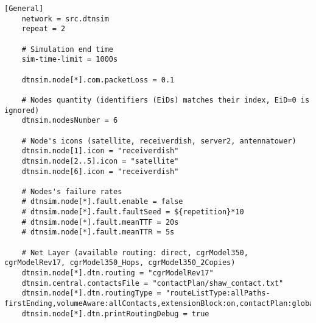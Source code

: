 \begin{lstlisting}[caption=inifile,label=inifile,]
    [General]
    network = src.dtnsim										
    repeat = 2
    
    # Simulation end time
    sim-time-limit = 1000s
    
    dtnsim.node[*].com.packetLoss = 0.1
    
    # Nodes quantity (identifiers (EiDs) matches their index, EiD=0 is ignored)			
    dtnsim.nodesNumber = 6	
    
    # Node's icons (satellite, receiverdish, server2, antennatower)
    dtnsim.node[1].icon = "receiverdish"
    dtnsim.node[2..5].icon = "satellite"
    dtnsim.node[6].icon = "receiverdish"
    
    # Nodes's failure rates
    # dtnsim.node[*].fault.enable = false
    # dtnsim.node[*].fault.faultSeed = ${repetition}*10
    # dtnsim.node[*].fault.meanTTF = 20s
    # dtnsim.node[*].fault.meanTTR = 5s
    
    # Net Layer (available routing: direct, cgrModel350, cgrModelRev17, cgrModel350_Hops, cgrModel350_2Copies)
    dtnsim.node[*].dtn.routing = "cgrModelRev17"
    dtnsim.central.contactsFile = "contactPlan/shaw_contact.txt"
    dtnsim.node[*].dtn.routingType = "routeListType:allPaths-firstEnding,volumeAware:allContacts,extensionBlock:on,contactPlan:global"
    dtnsim.node[*].dtn.printRoutingDebug = true
    

\end{lstlisting}

